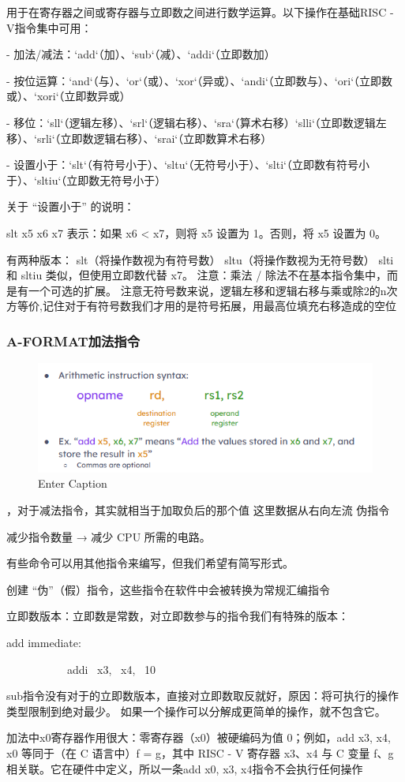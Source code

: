 \documentclass{ctexart}
\begin{document}
用于在寄存器之间或寄存器与立即数之间进行数学运算。以下操作在基础RISC - V指令集中可用：  \par
- 加法/减法：`add`（加）、`sub`（减）、`addi`（立即数加）\par  
- 按位运算：`and`（与）、`or`（或）、`xor`（异或）、`andi`（立即数与）、`ori`（立即数或）、`xori`（立即数异或）  \par
- 移位：`sll`（逻辑左移）、`srl`（逻辑右移）、`sra`（算术右移）\、`slli`（立即数逻辑左移）、`srli`（立即数逻辑右移）、`srai`（立即数算术右移）  \par
- 设置小于：`slt`（有符号小于）、`sltu`（无符号小于）、`slti`（立即数有符号小于）、`sltiu`（立即数无符号小于） \par
关于 “设置小于” 的说明：\par
slt x5 x6 x7 表示：如果 x6 < x7，则将 x5 设置为 1。否则，将 x5 设置为 0。\par
有两种版本：
slt（将操作数视为有符号数）
sltu（将操作数视为无符号数）
slti 和 sltiu 类似，但使用立即数代替 x7。
注意：乘法 / 除法不在基本指令集中，而是有一个可选的扩展。
注意无符号数来说，逻辑左移和逻辑右移与乘或除2的n次方等价,记住对于有符号数我们才用的是符号拓展，用最高位填充右移造成的空位\par
\subsubsection{A-FORMAT加法指令}
\begin{figure}
    \centering
    \includegraphics[width=0.25\linewidth]{加法指令格式.png}
    \caption{Enter Caption}
    \label{fig:enter-label}
\end{figure}，对于减法指令，其实就相当于加取负后的那个值
这里数据从右向左流
伪指令\par
减少指令数量 → 减少 CPU 所需的电路。\par
有些命令可以用其他指令来编写，但我们希望有简写形式。\par
创建 “伪”（假）指令，这些指令在软件中会被转换为常规汇编指令\par
立即数版本：立即数是常数，对立即数参与的指令我们有特殊的版本：\par
add immediate:\par
\ \ \ \ \ \ \ \ \ \ \ addi \ x3, \ x4, \ 10\par
sub指令没有对于的立即数版本，直接对立即数取反就好，原因：将可执行的操作类型限制到绝对最少。
如果一个操作可以分解成更简单的操作，就不包含它。\par
加法中x0寄存器作用很大：零寄存器（x0）被硬编码为值 0；例如，add x3, x4, x0 等同于（在 C 语言中）f = g，其中 RISC - V 寄存器 x3、x4 与 C 变量 f、g 相关联。它在硬件中定义，所以一条add x0, x3, x4指令不会执行任何操作\par
\end{document}
